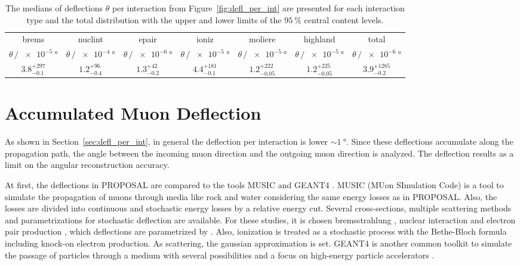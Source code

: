 \documentclass[pdflatex, sn-mathphys]{sn-jnl}%
\theoremstyle{thmstyleone}%
\theoremstyle{thmstyletwo}%
\theoremstyle{thmstylethree}%
\begin{document}
\begin{table}
    \centering 
    \caption{The medians of deflections $\theta$ per interaction from Figure~\ref{fig:defl_per_int} are presented for each interaction type and the total distribution with the upper and lower limits of the $\SI{95}{\percent}$ 
    central content levels.}
    \begin{tabular}{ccccccc}
        \toprule 
        brems & nuclint & epair & ioniz & moliere & highland & total \\
        $\theta\,/\,\SI{e-5}{\degree}$ & $\theta\,/\,\SI{e-4}{\degree}$ & $\theta\,/\,\SI{e-6}{\degree}$ & $\theta\,/\,\SI{e-5}{\degree}$ & $\theta\,/\,\SI{e-5}{\degree}$ & $\theta\,/\,\SI{e-5}{\degree}$ & $\theta\,/\,\SI{e-6}{\degree}$\\
        \midrule 
        $3.8_{-0.1}^{+297}$ & $1.2_{-0.4}^{+96}$ & $1.3_{-0.2}^{+42}$ & $4.4_{-0.1}^{+181}$& $1.2_{-0.05}^{+222}$ & $1.2_{-0.05}^{+225}$ & $3.9_{-0.2}^{+1285}$\\ 
        \bottomrule
    \end{tabular}
    \label{tab:defl_per_int}
\end{table}

\section{Accumulated Muon Deflection}\label{sec:accum_defl}

As shown in Section~\ref{sec:defl_per_int}, in general the deflection per interaction 
is lower $\sim\SI{1}{\degree}$. Since these deflections accumulate along the 
propagation path, the angle between the incoming muon direction and the outgoing 
muon direction is analyzed. The deflection results as a limit on the 
angular reconstruction accuracy.

At first, the deflections in PROPOSAL are compared to 
the tools MUSIC \cite{MUSIC,comparison_MUSIC_GEANT4_2009} and GEANT4 \cite{GEANT4}.
MUSIC (MUon SImulation Code) is a tool to simulate the propagation of muons 
through media like rock and water considering the same energy losses as in 
PROPOSAL. Also, the losses are divided into continuous and stochastic 
energy losses by a relative energy cut. Several cross-sections, multiple scattering 
methods and parametrizations for stochastic deflection are 
available. For these studies, it is chosen bremsstrahlung \cite{Bremsstrahlung_KKP}, 
nuclear interaction \cite{nulcint_bugaev_Shlepin, bugaev_1980_defl,bugaev_1981_defl} 
and electron pair production \cite{epair_kelner,epair_kokoulin_petrukhin}, 
which deflections are parametrized by \cite{Van_Ginneken}. 
Also, ionization is treated as a stochastic process with the Bethe-Bloch 
formula including knock-on electron production. As scattering, the gaussian 
approximation \cite{HIGHLAND_1975} is set. 
GEANT4 is another common toolkit to simulate the passage of particles through 
a medium with several possibilities and a focus on high-energy 
particle accelerators \cite{GEANT4}. 
\end{document}

